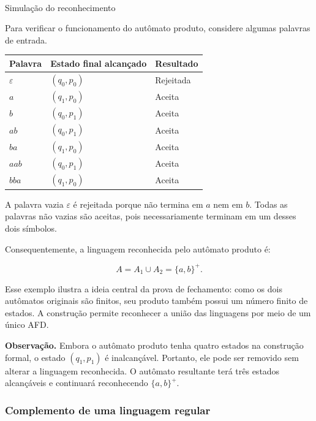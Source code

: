 \documentclass[
  brazilian,
  letterpaper,
]{book}
\makeatletter
\let\oldparagraph\paragraph
\renewcommand{\paragraph}{
    \@ifstar
      \xxxParagraphStar
      \xxxParagraphNoStar
  }
\newcommand{\xxxParagraphStar}[1]{\oldparagraph*{#1}\mbox{}}
\newcommand{\xxxParagraphNoStar}[1]{\oldparagraph{#1}\mbox{}}
\theoremstyle{plain}
\theoremstyle{definition}
\theoremstyle{remark}
\makeatother
\begin{document}
\paragraph{Simulação do
reconhecimento}\label{simulauxe7uxe3o-do-reconhecimento}

Para verificar o funcionamento do autômato produto, considere algumas
palavras de entrada.

\begin{longtable*}[]{|l|l|l|}
\toprule\noalign{}
Palavra & Estado final alcançado & Resultado \\
\midrule\noalign{}
\endhead
\bottomrule\noalign{}
\endlastfoot
\(\varepsilon\) & \((q_0,p_0)\) & Rejeitada \\
\midrule
\(a\) & \((q_1,p_0)\) & Aceita \\
\midrule
\(b\) & \((q_0,p_1)\) & Aceita \\
\midrule
\(ab\) & \((q_0,p_1)\) & Aceita \\
\midrule
\(ba\) & \((q_1,p_0)\) & Aceita \\
\midrule
\(aab\) & \((q_0,p_1)\) & Aceita \\
\midrule
\(bba\) & \((q_1,p_0)\) & Aceita \\
\end{longtable*}

A palavra vazia \(\varepsilon\) é rejeitada porque não termina em \(a\)
nem em \(b\). Todas as palavras não vazias são aceitas, pois
necessariamente terminam em um desses dois símbolos.

Consequentemente, a linguagem reconhecida pelo autômato produto é:

\[
A=A_1\cup A_2=\{a,b\}^+.
\]

Esse exemplo ilustra a ideia central da prova de fechamento: como os
dois autômatos originais são finitos, seu produto também possui um
número finito de estados. A construção permite reconhecer a união das
linguagens por meio de um único AFD.

\textbf{Observação.} Embora o autômato produto tenha quatro estados na
construção formal, o estado \((q_1,p_1)\) é inalcançável. Portanto, ele
pode ser removido sem alterar a linguagem reconhecida. O autômato
resultante terá três estados alcançáveis e continuará reconhecendo
\(\{a,b\}^+\).

\subsubsection{Complemento de uma linguagem
regular}\label{complemento-de-uma-linguagem-regular}
\end{document}
